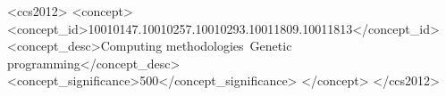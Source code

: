 \documentclass[sigconf]{acmart}
\begin{document}
%
%
\begin{CCSXML}
<ccs2012>
<concept>
<concept_id>10010147.10010257.10010293.10011809.10011813</concept_id>
<concept_desc>Computing methodologies~Genetic programming</concept_desc>
<concept_significance>500</concept_significance>
</concept>
</ccs2012>
\end{CCSXML}




\maketitle




 
\end{document}
